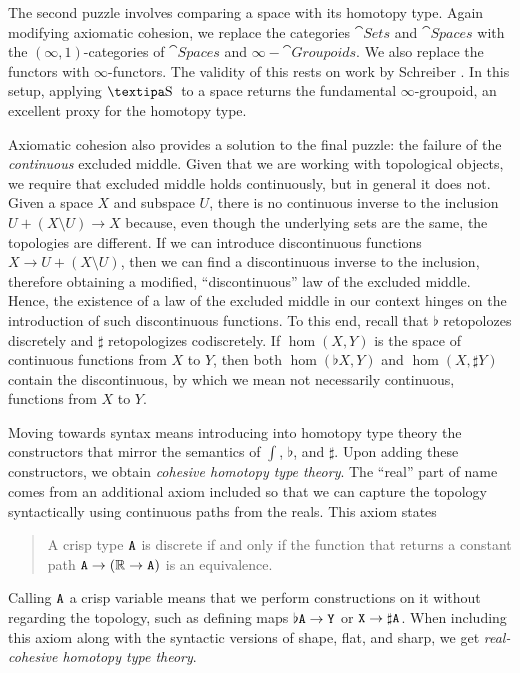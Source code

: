 \documentclass{amsart}
\begin{document}
The second puzzle involves comparing a space with its
homotopy type.  Again modifying axiomatic cohesion, we
replace the categories $ \cat{Sets} $ and $ \cat{Spaces} $
with the $ (\infty,1) $-categories of $ \cat{Spaces} $ and $
\infty-\cat{Groupoids} $. We also replace the functors with
$ \infty $-functors.  The validity of this rests on work by
Schreiber \cite{schreib:diff}. In this setup, applying $
\shape $ to a space returns the fundamental $ \infty
$-groupoid, an excellent proxy for the homotopy type.  

Axiomatic cohesion also provides a solution to the final
puzzle: the failure of the \emph{continuous} excluded
middle. Given that we are working with topological objects,
we require that excluded middle holds continuously, but in
general it does not. Given a space $ X $ and subspace $ U $,
there is no continuous inverse to the inclusion
$ U + (X \setminus U) \to X $ because, even though the
underlying sets are the same, the topologies are
different. If we can introduce discontinuous functions
$ X \to U + (X \setminus U) $, then we can find a
discontinuous inverse to the inclusion, therefore obtaining
a modified, ``discontinuous'' law of the excluded
middle. Hence, the existence of a law of the excluded middle
in our context hinges on the introduction of such
discontinuous functions. To this end, recall that $ \flat $
retopolozes discretely and $ \sharp $ retopologizes
codiscretely. If $ \hom (X,Y) $ is the space of continuous
functions from $ X $ to $ Y $, then both $ \hom (\flat X,Y)
$ and $ \hom (X,\sharp Y) $ contain the discontinuous, by
which we mean not necessarily continuous, functions from $ X
$ to $ Y $.  

Moving towards syntax means introducing into homotopy type
theory the constructors that mirror the semantics of $ \int $,
$ \flat $, and $ \sharp $. Upon adding these constructors,
we obtain \emph{cohesive homotopy type theory}. The ``real''
part of name comes from an additional axiom included so that
we can capture the topology syntactically using continuous
paths from the reals. This axiom states
\begin{center}
\begin{quotation}
  A crisp type $ \mathtt{A} $ is discrete if and only if the
  function that returns a constant path
  $ \mathtt{A} \to (\mathbb{R} \to \mathtt{A}) $ is an equivalence.
\end{quotation}
\end{center}
Calling $ \mathtt{A} $ a crisp variable means that we
perform constructions on it without regarding the topology,
such as defining maps $ \flat\mathtt{A} \to \mathtt{Y} $ or $
\mathtt{X}\to\sharp\mathtt{A} $.  When including this axiom
along with the syntactic versions of shape, flat, and sharp,
we get \emph{real-cohesive homotopy type theory}.
\end{document}
